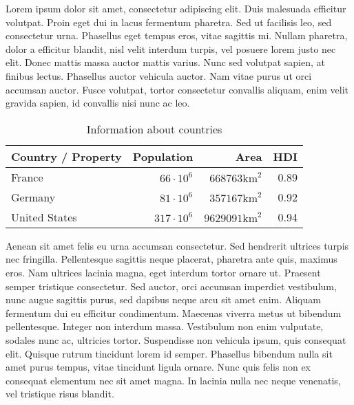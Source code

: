 \documentclass[a4paper]{scrartcl}
\begin{document}
Lorem ipsum dolor sit amet, consectetur adipiscing elit. Duis malesuada 
efficitur volutpat. Proin eget dui in lacus fermentum pharetra. Sed ut 
facilisis leo, sed consectetur urna. Phasellus eget tempus eros, vitae 
sagittis mi. Nullam pharetra, dolor a efficitur blandit, nisl velit interdum 
turpis, vel posuere lorem justo nec elit. Donec mattis massa auctor mattis 
varius. Nunc sed volutpat sapien, at finibus lectus. Phasellus auctor vehicula 
auctor. Nam vitae purus ut orci accumsan auctor. Fusce volutpat, tortor 
consectetur convallis aliquam, enim velit gravida sapien, id convallis nisi 
nunc ac leo.

    \begin{table}[ht]
        \centering
        \begin{tabular}{l|rrr}
        \toprule
        Country / Property & Population       & Area     & HDI \\\midrule
        France             & $66 \cdot 10^6$  & $668763\text{km}^2$  & 0.89 \\
        Germany            & $81 \cdot 10^6$  & $357167\text{km}^2$  & 0.92 \\
        United States      & $317 \cdot 10^6$ & $9629091\text{km}^2$ & 0.94 \\
        \bottomrule
        \end{tabular}
        \caption{Information about countries}
        \label{table:countries}
    \end{table}

Aenean sit amet felis eu urna accumsan consectetur. Sed hendrerit ultrices 
turpis nec fringilla. Pellentesque sagittis neque placerat, pharetra ante 
quis, maximus eros. Nam ultrices lacinia magna, eget interdum tortor ornare 
ut. Praesent semper tristique consectetur. Sed auctor, orci accumsan imperdiet 
vestibulum, nunc augue sagittis purus, sed dapibus neque arcu sit amet enim. 
Aliquam fermentum dui eu efficitur condimentum. Maecenas viverra metus ut 
bibendum pellentesque. Integer non interdum massa. Vestibulum non enim 
vulputate, sodales nunc ac, ultricies tortor. Suspendisse non vehicula ipsum, 
quis consequat elit. Quisque rutrum tincidunt lorem id semper. Phasellus 
bibendum nulla sit amet purus tempus, vitae tincidunt ligula ornare. Nunc quis 
felis non ex consequat elementum nec sit amet magna. In lacinia nulla nec neque 
venenatis, vel tristique risus blandit.
\end{document}
